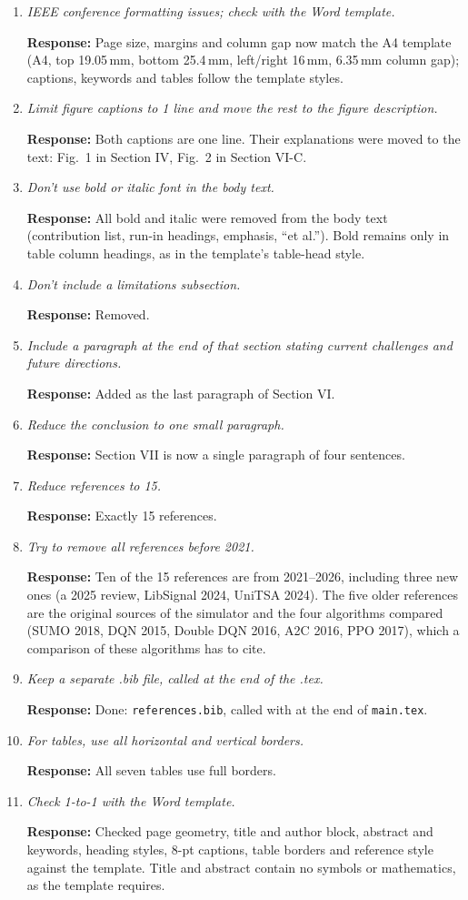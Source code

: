 \documentclass[11pt,a4paper]{article}
\newcommand{\cm}[2]{\item[\textbf{#1.}] \textit{#2}\par}
\newcommand{\re}{\par\textbf{Response:} }
\begin{document}
\begin{enumerate}[leftmargin=*, label={}, itemsep=6pt]

\cm{1}{IEEE conference formatting issues; check with the Word template.}
\re Page size, margins and column gap now match the A4 template (A4, top 19.05\,mm, bottom 25.4\,mm, left/right 16\,mm, 6.35\,mm column gap); captions, keywords and tables follow the template styles.

\cm{2}{Limit figure captions to 1 line and move the rest to the figure description.}
\re Both captions are one line. Their explanations were moved to the text: Fig.~1 in Section IV, Fig.~2 in Section VI-C.

\cm{3}{Don't use bold or italic font in the body text.}
\re All bold and italic were removed from the body text (contribution list, run-in headings, emphasis, ``et al.''). Bold remains only in table column headings, as in the template's table-head style.

\cm{4}{Don't include a limitations subsection.}
\re Removed.

\cm{5}{Include a paragraph at the end of that section stating current challenges and future directions.}
\re Added as the last paragraph of Section VI.

\cm{6}{Reduce the conclusion to one small paragraph.}
\re Section VII is now a single paragraph of four sentences.

\cm{7}{Reduce references to 15.}
\re Exactly 15 references.

\cm{8}{Try to remove all references before 2021.}
\re Ten of the 15 references are from 2021--2026, including three new ones (a 2025 review, LibSignal 2024, UniTSA 2024). The five older references are the original sources of the simulator and the four algorithms compared (SUMO 2018, DQN 2015, Double DQN 2016, A2C 2016, PPO 2017), which a comparison of these algorithms has to cite.

\cm{9}{Keep a separate .bib file, called at the end of the .tex.}
\re Done: \texttt{references.bib}, called with \verb|| at the end of \texttt{main.tex}.

\cm{10}{For tables, use all horizontal and vertical borders.}
\re All seven tables use full borders.

\cm{11}{Check 1-to-1 with the Word template.}
\re Checked page geometry, title and author block, abstract and keywords, heading styles, 8-pt captions, table borders and reference style against the template. Title and abstract contain no symbols or mathematics, as the template requires.


\end{enumerate}
\end{document}
